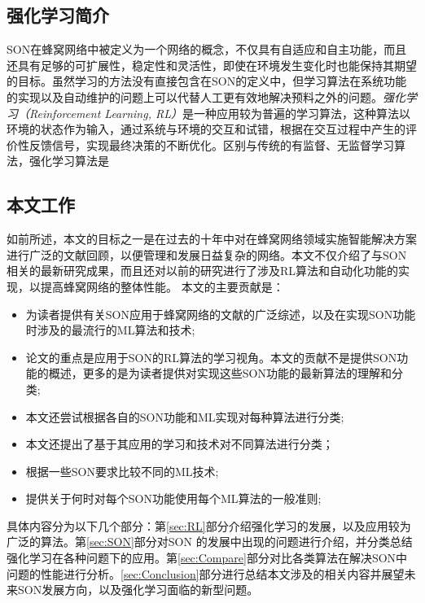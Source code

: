 \documentclass{IEEEtran}
\begin{document}
\subsection{强化学习简介}


SON在蜂窝网络中被定义为一个网络的概念，不仅具有自适应和自主功能，而且还具有足够的可扩展性，稳定性和灵活性，即使在环境发生变化时也能保持其期望的目标。虽然学习的方法没有直接包含在SON的定义中，但学习算法在系统功能的实现以及自动维护的问题上可以代替人工更有效地解决预料之外的问题。\emph{强化学习（Reinforcement Learning, RL）}是一种应用较为普遍的学习算法，这种算法以环境的状态作为输入，通过系统与环境的交互和试错，根据在交互过程中产生的评价性反馈信号，实现最终决策的不断优化。区别与传统的有监督、无监督学习算法，强化学习算法是


\subsection{本文工作}

如前所述，本文的目标之一是在过去的十年中对在蜂窝网络领域实施智能解决方案进行广泛的文献回顾，以便管理和发展日益复杂的网络。本文不仅介绍了与SON相关的最新研究成果，而且还对以前的研究进行了涉及RL算法和自动化功能的实现，以提高蜂窝网络的整体性能。
本文的主要贡献是：
\begin{itemize}
  \item 为读者提供有关SON应用于蜂窝网络的文献的广泛综述，以及在实现SON功能时涉及的最流行的ML算法和技术;
  \item 论文的重点是应用于SON的RL算法的学习视角。本文的贡献不是提供SON功能的概述，更多的是为读者提供对实现这些SON功能的最新算法的理解和分类;
  \item 本文还尝试根据各自的SON功能和ML实现对每种算法进行分类;
  \item 本文还提出了基于其应用的学习和技术对不同算法进行分类；
  \item 根据一些SON要求比较不同的ML技术;
  \item 提供关于何时对每个SON功能使用每个ML算法的一般准则;
\end{itemize}

具体内容分为以下几个部分：第\ref{sec:RL}部分介绍强化学习的发展，以及应用较为广泛的算法。第\ref{sec:SON}部分对SON 的发展中出现的问题进行介绍，并分类总结强化学习在各种问题下的应用。第\ref{sec:Compare}部分对比各类算法在解决SON中问题的性能进行分析。\ref{sec:Conclusion}部分进行总结本文涉及的相关内容并展望未来SON发展方向，以及强化学习面临的新型问题。
\end{document}
